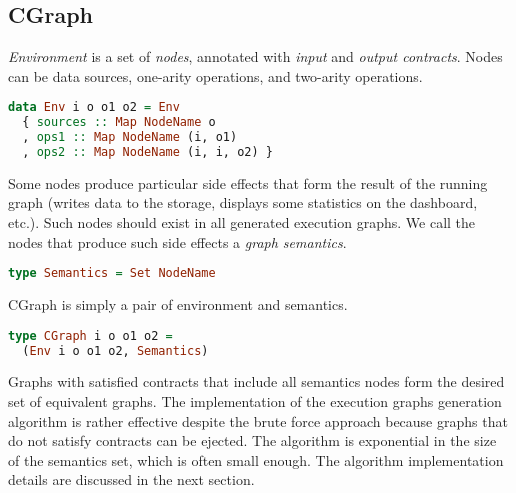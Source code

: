 \subsection{CGraph}

{\em Environment} is a set of {\em nodes}, annotated with {\em input} and {\em output contracts}.
Nodes can be data sources, one-arity operations, and two-arity operations.

\begin{lstlisting}[language=Haskell]
data Env i o o1 o2 = Env
  { sources :: Map NodeName o
  , ops1 :: Map NodeName (i, o1)
  , ops2 :: Map NodeName (i, i, o2) }
\end{lstlisting}

Some nodes produce particular side effects that form the result of the running graph (writes data to the storage, displays some statistics on the dashboard, etc.).
Such nodes should exist in all generated execution graphs.
We call the nodes that produce such side effects a {\em graph semantics}.

\begin{lstlisting}[language=Haskell]
type Semantics = Set NodeName
\end{lstlisting}

CGraph is simply a pair of environment and semantics.

\begin{lstlisting}[language=Haskell]
type CGraph i o o1 o2 = 
  (Env i o o1 o2, Semantics)
\end{lstlisting}

Graphs with satisfied contracts that include all semantics nodes form the desired set of equivalent graphs. 
The implementation of the execution graphs generation algorithm is rather effective despite the brute force approach because graphs that do not satisfy contracts can be ejected. 
The algorithm is exponential in the size of the semantics set, which is often small enough.
The algorithm implementation details are discussed in the next section.
